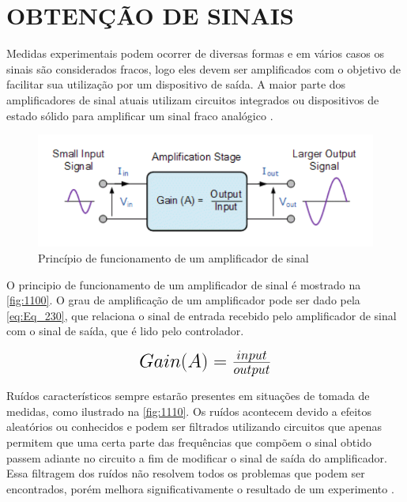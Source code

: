 \section{OBTENÇÃO DE SINAIS}

Medidas experimentais podem ocorrer de diversas formas e em vários casos os sinais são considerados fracos, logo eles devem ser amplificados com o objetivo de facilitar sua
utilização por um dispositivo de saída. A maior parte dos amplificadores de sinal atuais utilizam circuitos integrados ou dispositivos de estado sólido para amplificar um
sinal fraco analógico \autocite{Hollman2011}.

\begin{figure}[htb]
	\caption{\label{fig:1100} Princípio de funcionamento de um amplificador de sinal}
	\begin{center}
		\includegraphics[width=\textwidth]{pictures/1100.png}
	\end{center}
\end{figure}

O principio de funcionamento de um amplificador de sinal é mostrado na \autoref{fig:1100}.
O grau de amplificação de um amplificador pode ser dado pela \autoref{eq:Eq_230}, que relaciona o sinal de entrada recebido pelo amplificador de sinal com o sinal de saída, que é lido pelo controlador.

\begin{equation}\label{eq:Eq_230}%
\mbox{\fontsize{17.28}{21.6}\selectfont\( %
Gain(A) = \frac{input}{output}
\)} %
\end{equation}

%
%
%

\hfill

Ruídos característicos sempre estarão presentes em situações de tomada de medidas, como ilustrado na \autoref{fig:1110}.
Os ruídos acontecem devido a efeitos aleatórios ou conhecidos e podem ser filtrados utilizando circuitos que apenas permitem que uma certa parte das frequências que compõem o sinal obtido passem
adiante no circuito a fim de modificar o sinal de saída do amplificador.
Essa filtragem dos ruídos não resolvem todos os problemas que podem ser encontrados, porém melhora significativamente o resultado de um experimento \autocite{Hollman2011}.

